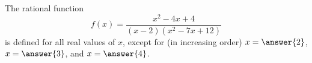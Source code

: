 \documentclass{ximera}
\author{Ivo Terek}
\begin{document}
\begin{exercise}

The rational function $$f(x) = \frac{x^2-4x+4}{(x-2)(x^2-7x+12)}$$ is defined for all real values of $x$, except for (in increasing order) $x = \answer{2}$, $x = \answer{3}$, and $x=\answer{4}$.

\end{exercise}
\end{document}
